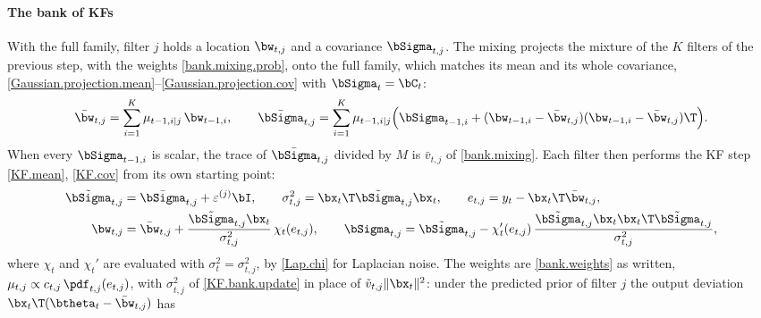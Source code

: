 
\paragraph{The bank of KFs}
With the full family, filter $j$ holds a location $\bw_{t,j}$ and a
covariance $\bSigma_{t,j}$. The mixing projects the mixture of the
$K$ filters of the previous step, with the weights
\eqref{bank.mixing.prob}, onto the full family, which matches its
mean and its whole covariance,
\eqref{Gaussian.projection.mean}--\eqref{Gaussian.projection.cov}
with $\bSigma_t = \bC_t$:
\begin{align}
\label{KF.bank.mixing}
    \bar{\bw}_{t,j} = \sum_{i=1}^K \mu_{t-1,i|j}\,\bw_{t-1,i},
    \qquad
    \bar{\bSigma}_{t,j} = \sum_{i=1}^K \mu_{t-1,i|j}
      \Big(\bSigma_{t-1,i}
      + (\bw_{t-1,i} - \bar{\bw}_{t,j})(\bw_{t-1,i} - \bar{\bw}_{t,j})\T\Big).
\end{align}
When every $\bSigma_{t-1,i}$ is scalar, the trace of
$\bar{\bSigma}_{t,j}$ divided by $M$ is $\bar{v}_{t,j}$ of
\eqref{bank.mixing}. Each filter then performs the KF step
\eqref{KF.mean}, \eqref{KF.cov} from its own starting point:
\begin{align}
\label{KF.bank.update}
    \tilde{\bSigma}_{t,j} &= \bar{\bSigma}_{t,j} + \varepsilon^{(j)}\bI,
    \qquad
    \sigma_{t,j}^2 = \bx_t\T\tilde{\bSigma}_{t,j}\bx_t,
    \qquad
    e_{t,j} = y_t - \bx_t\T\bar{\bw}_{t,j},
    \nonumber\\
    \bw_{t,j} &= \bar{\bw}_{t,j}
       + \frac{\tilde{\bSigma}_{t,j}\bx_t}{\sigma_{t,j}^2}\,\chi_t(e_{t,j}),
    \qquad
    \bSigma_{t,j} = \tilde{\bSigma}_{t,j}
       - \chi_t'(e_{t,j})\,
         \frac{\tilde{\bSigma}_{t,j}\bx_t\bx_t\T\tilde{\bSigma}_{t,j}}
              {\sigma_{t,j}^2},
\end{align}
where $\chi_t$ and $\chi_t'$ are evaluated with
$\sigma_t^2 = \sigma_{t,j}^2$, by \eqref{Lap.chi} for Laplacian
noise. The weights are \eqref{bank.weights} as written,
$\mu_{t,j} \propto c_{t,j}\,\pdf_{t,j}(e_{t,j})$, with
$\sigma_{t,j}^2$ of \eqref{KF.bank.update} in place of
$\tilde{v}_{t,j}\|\bx_t\|^2$: under the predicted prior of filter
$j$ the output deviation $\bx_t\T(\btheta_t - \bar{\bw}_{t,j})$ has
